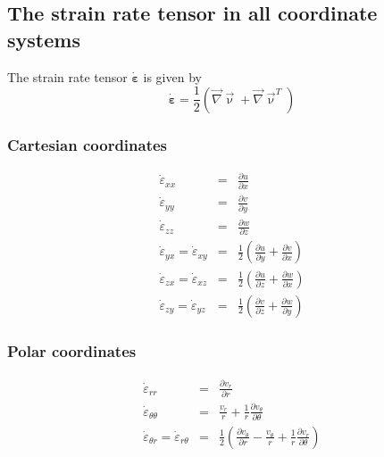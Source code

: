 \newpage
\subsection{The strain rate tensor in all coordinate systems}

The strain rate tensor $\dot{\bm\varepsilon}$ is given by
\begin{equation}
\dot{\bm \varepsilon} = \frac{1}{2}( {\vec \nabla}{\vec \upnu}+ {\vec \nabla}{\vec \upnu}^T) 
\end{equation}

\subsubsection{Cartesian coordinates}
\begin{eqnarray}
\dot\varepsilon_{xx} &=& \frac{\partial u}{\partial x} \\
\dot\varepsilon_{yy} &=& \frac{\partial v}{\partial y} \\
\dot\varepsilon_{zz} &=& \frac{\partial w}{\partial z} \\
\dot\varepsilon_{yx} =
\dot\varepsilon_{xy} &=& \frac{1}{2} \left( \frac{\partial u}{\partial y} + \frac{\partial v}{\partial x}  \right)\\
\dot\varepsilon_{zx} =
\dot\varepsilon_{xz} &=& \frac{1}{2} \left( \frac{\partial u}{\partial z} + \frac{\partial w}{\partial x}  \right)\\
\dot\varepsilon_{zy} =
\dot\varepsilon_{yz} &=& \frac{1}{2} \left( \frac{\partial v}{\partial z} + \frac{\partial w}{\partial y}  \right)
\end{eqnarray}

\subsubsection{Polar coordinates}

\begin{eqnarray}
\dot\varepsilon_{rr} &=& \frac{\partial v_r}{\partial r} \\
\dot\varepsilon_{\theta\theta} &=& \frac{v_r}{r} + \frac{1}{r} \frac{\partial v_\theta}{\partial \theta}  \\
\dot\varepsilon_{\theta r} =
\dot\varepsilon_{r\theta} &=& \frac{1}{2} \left(   \frac{\partial v_\theta}{\partial r} - \frac{v_\theta}{r} 
+\frac{1}{r} \frac{\partial v_r}{\partial \theta}  \right) 
\end{eqnarray}

